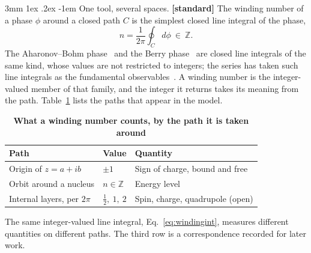 \documentclass[%
 reprint, amsmath,amssymb, aps, prb, ]{revtex4-2}
\makeatletter
\numberwithin{equation}{section}
\renewcommand\paragraph{%
  \@startsection{paragraph}{4}{\z@}%
    {3mm \@plus 1ex \@minus .2ex}
    {-1em}
    {\normalfont\normalsize\itshape}}
\makeatother
\begin{document}
\paragraph{One tool, several spaces.} \textbf{[standard]} The winding number of a phase $\phi$ around a closed path $C$ is the simplest closed line integral of the phase,
\begin{equation}
n=\frac{1}{2\pi}\oint_C d\phi\ \in\ \mathbb{Z}.
\label{eq:windingint}
\end{equation}
The Aharonov--Bohm phase~\cite{ref:ab59} and the Berry phase~\cite{ref:berry84} are closed line integrals of the same kind, whose values are not restricted to integers; the series has taken such line integrals as the fundamental observables~\cite{ref:p29,ref:p30,ref:p31}. A winding number is the integer-valued member of that family, and the integer it returns takes its meaning from the path. Table~\ref{tab:windings} lists the paths that appear in the model.

\begin{table}[t!]
\centering
\caption{\textbf{What a winding number counts, by the path it is taken around}}
\label{tab:windings}
\renewcommand{\arraystretch}{1.3}
\begin{tabular}{p{2.6cm}p{1.1cm}p{3.5cm}}
\toprule
\textbf{Path} & \textbf{Value} & \textbf{Quantity} \\
\midrule
\raggedright Origin of $z=a+ib$ & $\pm1$ & \raggedright Sign of charge, bound and free\tabularnewline
\addlinespace[0.15cm]
\raggedright Orbit around a nucleus & $n\in\mathbb{Z}$ & \raggedright Energy level\tabularnewline
\addlinespace[0.15cm]
\raggedright Internal layers, per $2\pi$ & $\tfrac12,\ 1,\ 2$ & \raggedright Spin, charge, quadrupole (open)\tabularnewline
\bottomrule
\end{tabular}
\vspace{0.2cm}
\begin{minipage}{0.95\columnwidth}
\justifying\footnotesize
The same integer-valued line integral, Eq.~\eqref{eq:windingint}, measures different quantities on different paths. The third row is a correspondence recorded for later work.
\end{minipage}
\end{table}
\end{document}
